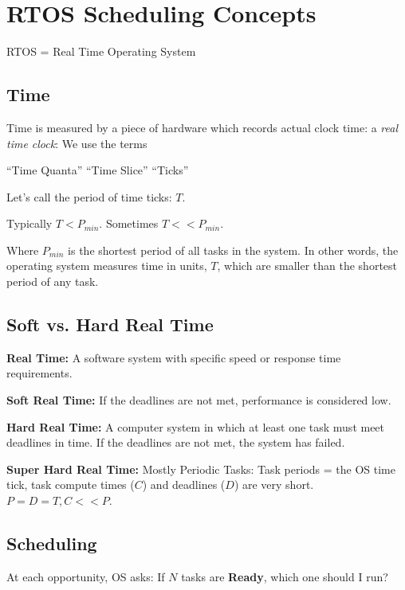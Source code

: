 \section{RTOS Scheduling Concepts}
RTOS = Real Time Operating System	%

\subsection{Time}\label{Time}


Time is measured by a piece of hardware which records actual
clock time: a {\it real time clock}:
We use the terms	%

``Time Quanta'' ``Time Slice''  ``Ticks''

Let's call the period of time ticks: $T$.

Typically $T < P_{min}$. Sometimes $T << P_{min}$.

Where $P_{min}$ is the shortest period of all tasks in the  system.
In other words, the operating system measures time in units, $T$, which
are smaller than the shortest period of any task.

\subsection{Soft vs. Hard Real Time}

{\bf Real Time:}  A software system with specific speed or response
time requirements.

{\bf Soft Real Time:} If the deadlines are not met,
performance is considered low.

{\bf Hard Real Time:} A computer system in which at least one task must meet
deadlines in time.  If the deadlines are not met, the system has failed.

{\bf Super Hard Real Time:} Mostly Periodic Tasks:
Task periods = the OS time tick, task compute times ($C$) and
deadlines ($D$) are very
short. $P = D = T, C << P$.

\subsection{Scheduling}

At each opportunity, OS asks:
If $N$ tasks are {\bf Ready}, which one should I run?

